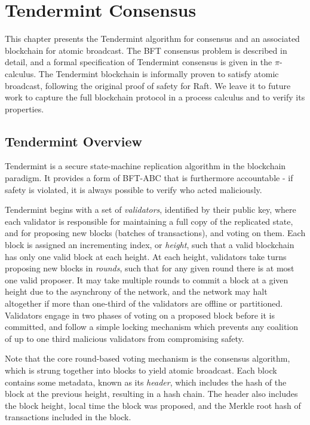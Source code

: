 \chapter{Tendermint Consensus}
\label{ch:tendermint}

This chapter presents the Tendermint algorithm for consensus 
and an associated blockchain for atomic broadcast.
The BFT consensus problem is described in detail, 
and a formal specification of Tendermint consensus is given in the $\pi$-calculus.
The Tendermint blockchain is informally proven to satisfy atomic broadcast,
following the original proof of safety for Raft.
We leave it to future work to capture the full blockchain protocol in 
a process calculus and to verify its properties.

\section{Tendermint Overview}

Tendermint is a secure state-machine replication algorithm in the blockchain paradigm.
It provides a form of BFT-ABC that is furthermore accountable - 
if safety is violated, it is always possible to verify who acted maliciously.

Tendermint begins with a set of \emph{validators}, identified by their public key,
where each validator is responsible for maintaining a full copy of the replicated state,
and for proposing new blocks (batches of transactions), and voting on them.
Each block is assigned an incrementing index, or \emph{height}, 
such that a valid blockchain has only one valid block at each height.
At each height, validators take turns proposing new blocks in \emph{rounds}, 
such that for any given round there is at most one valid proposer.
It may take multiple rounds to commit a block at a given height due to the asynchrony of the network,
and the network may halt altogether if more than one-third of the validators are offline or partitioned.
Validators engage in two phases of voting on a proposed block before it is committed, 
and follow a simple locking mechanism which prevents any coalition of up to 
one third malicious validators from compromising safety.

Note that the core round-based voting mechanism is the consensus algorithm, 
which is strung together into blocks to yield atomic broadcast.
Each block contains some metadata, known as its \emph{header}, 
which includes the hash of the block at the previous height, resulting in a hash chain.
The header also includes the block height, local time the block was proposed, 
and the Merkle root hash of transactions included in the block.

